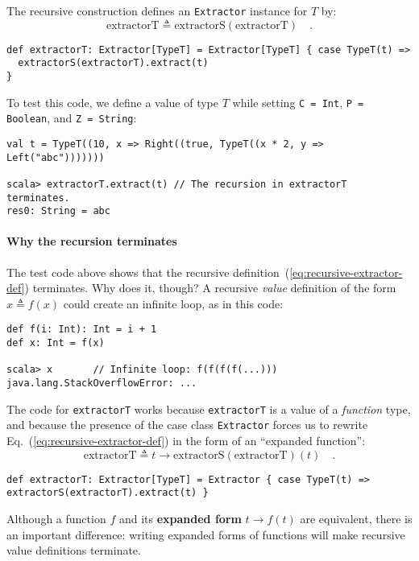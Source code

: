 The recursive construction defines an \lstinline!Extractor! instance
for $T$ by:
\begin{equation}
\text{extractorT}\triangleq\text{extractorS}\left(\text{extractorT}\right)\quad.\label{eq:recursive-extractor-def}
\end{equation}
\begin{lstlisting}
def extractorT: Extractor[TypeT] = Extractor[TypeT] { case TypeT(t) =>
  extractorS(extractorT).extract(t)
}
\end{lstlisting}
To test this code, we define a value of type $T$ while setting \lstinline!C = Int!,
\lstinline!P = Boolean!, and \lstinline!Z = String!:
\begin{lstlisting}
val t = TypeT((10, x => Right((true, TypeT((x * 2, y => Left("abc")))))))

scala> extractorT.extract(t) // The recursion in extractorT terminates.
res0: String = abc
\end{lstlisting}


\paragraph{Why the recursion terminates}

The test code above shows that the recursive definition~(\ref{eq:recursive-extractor-def})
terminates. Why does it, though? A recursive \emph{value} definition
of the form $x\triangleq f(x)$ could create an infinite loop, as
in this code:
\begin{lstlisting}
def f(i: Int): Int = i + 1
def x: Int = f(x)

scala> x       // Infinite loop: f(f(f(f(...)))
java.lang.StackOverflowError: ...
\end{lstlisting}
The code for \lstinline!extractorT! works because \lstinline!extractorT!
is a value of a \emph{function} type, and because the presence of
the case class \lstinline!Extractor! forces us to rewrite Eq.~(\ref{eq:recursive-extractor-def})
in the form of an \textsf{``}expanded function\textsf{''}:
\[
\text{extractorT}\triangleq t\rightarrow\text{extractorS}\left(\text{extractorT}\right)(t)\quad.
\]
\begin{lstlisting}
def extractorT: Extractor[TypeT] = Extractor { case TypeT(t) => extractorS(extractorT).extract(t) }
\end{lstlisting}
Although a function $f$ and its \textbf{expanded form} 
$t\rightarrow f(t)$ are equivalent, there is an important difference:
writing expanded forms of functions will make recursive value definitions
 terminate.

